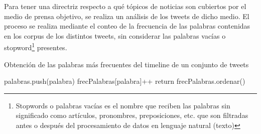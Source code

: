 Para tener una directriz respecto a qué tópicos de noticias son cubiertos por el medio de prensa objetivo, se realiza un análisis de los tweets de dicho medio.
El proceso se realiza mediante el conteo de la frecuencia de las palabras contenidas en los corpus de los distintos tweets, sin considerar las palabras vacías o stopword\footnote{Stopwords o palabras vacías es el nombre que reciben las palabras sin significado como artículos, pronombres, preposiciones, etc. que son filtradas antes o después del procesamiento de datos en lenguaje natural (texto)} presentes.

\begin{algorithm}
	\caption{Obtención de las palabras más frecuentes del timeline de un conjunto de tweets}\label{ciudadesLeven}
	\begin{algorithmic}[1]
		\State palabras.push(palabra)
		\State frecPalabras[palabra]++
		\EndIf
		\EndFor
		\EndFor
		\EndFor
		\State return frecPalabras.ordenar()
		\EndFunction
	\end{algorithmic}
\end{algorithm}




